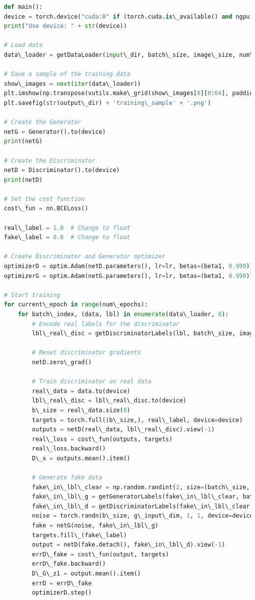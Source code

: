 \documentclass[12pt, a4paper]{article}
\begin{document}
	\begin{lstlisting}[language=Python, breaklines=true, breakatwhitespace=true, basicstyle=\ttfamily, columns=fullflexible]
def main():
device = torch.device("cuda:0" if (torch.cuda.is\_available() and ngpu > 0) else "cpu")
print("Use device: " + str(device))

# Load data
data\_loader = getDataLoader(input\_dir, batch\_size, image\_size, num\_workers, labels\_number)

# Save a sample of the training data
show\_images = next(iter(data\_loader))
plt.imshow(np.transpose(vutils.make\_grid(show\_images[0][0:64], padding=2, normalize=True), (1, 2, 0)))
plt.savefig(str(output\_dir) + 'training\_sample' + '.png')

# Create the Generator
netG = Generator().to(device)
print(netG)

# Create the Discriminator
netD = Discriminator().to(device)
print(netD)

# Set the cost function
cost\_fun = nn.BCELoss()

real\_label = 1.0  # Change to float
fake\_label = 0.0  # Change to float

# Create Discriminator and Generator optimizer
optimizerD = optim.Adam(netD.parameters(), lr=lr, betas=(beta1, 0.999))
optimizerG = optim.Adam(netG.parameters(), lr=lr, betas=(beta1, 0.999))

# Start training
for current\_epoch in range(num\_epochs):
	for batch\_index, (data, lbl) in enumerate(data\_loader, 0):
		# Encode real labels for the discriminator
		lbl\_real\_disc = getDiscriminatorLabels(lbl, batch\_size, image\_size)
		
		# Reset discriminator gradients
		netD.zero\_grad()
		
		# Train discriminator on real data
		real\_data = data.to(device)
		lbl\_real\_disc = lbl\_real\_disc.to(device)
		b\_size = real\_data.size(0)
		targets = torch.full((b\_size,), real\_label, device=device)
		outputs = netD(real\_data, lbl\_real\_disc).view(-1)
		real\_loss = cost\_fun(outputs, targets)
		real\_loss.backward()
		D\_x = outputs.mean().item()
		
		# Generate fake data
		fake\_in\_lbl\_clear = np.random.randint(2, size=(batch\_size, n\_labels))
		fake\_in\_lbl\_g = getGeneratorLabels(fake\_in\_lbl\_clear, batch\_size).to(device)
		fake\_in\_lbl\_d = getDiscriminatorLabels(fake\_in\_lbl\_clear, batch\_size, image\_size).to(device)
		noise = torch.randn(b\_size, g\_input\_dim, 1, 1, device=device)
		fake = netG(noise, fake\_in\_lbl\_g)
		targets.fill\_(fake\_label)
		output = netD(fake.detach(), fake\_in\_lbl\_d).view(-1)
		errD\_fake = cost\_fun(output, targets)
		errD\_fake.backward()
		D\_G\_z1 = output.mean().item()
		errD = errD\_fake
		optimizerD.step()
		

\end{lstlisting}
\end{document}
